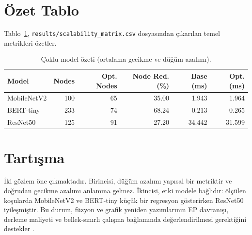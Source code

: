 \section{Özet Tablo}
Tablo~\ref{tab:scalability}, \texttt{results/scalability\_matrix.csv} dosyasından çıkarılan temel metrikleri özetler.

\begin{table}[h!]
\centering
\caption{Çoklu model özeti (ortalama gecikme ve düğüm azalımı).}
\label{tab:scalability}
\begin{tabular}{lrrrrr}
\hline
\textbf{Model} & \textbf{Nodes} & \textbf{Opt. Nodes} & \textbf{Node Red. (\%)} & \textbf{Base (ms)} & \textbf{Opt. (ms)} \\
\hline
MobileNetV2 & 100 & 65 & 35.00 & 1.943 & 1.964 \\
BERT-tiny  & 233 & 74 & 68.24 & 0.213 & 0.265 \\
ResNet50   & 125 & 91 & 27.20 & 34.442 & 31.599 \\
\hline
\end{tabular}
\end{table}

\section{Tartışma}
İki gözlem öne çıkmaktadır.
Birincisi, düğüm azalımı yapısal bir metriktir ve doğrudan gecikme azalımı anlamına gelmez.
İkincisi, etki modele bağlıdır: ölçülen koşularda MobileNetV2 ve BERT-tiny küçük bir regresyon gösterirken ResNet50 iyileşmiştir.
Bu durum, füzyon ve grafik yeniden yazımlarının EP davranışı, derleme maliyeti ve bellek-sınırlı çalışma bağlamında değerlendirilmesi gerektiğini destekler \cite{memorywall}.